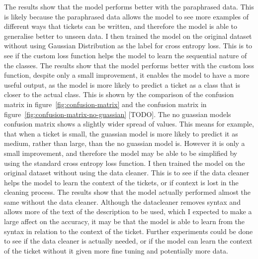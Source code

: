 \documentclass{UoYCSproject}
\begin{document}
    The results show that the model performs better with the paraphrased data. This is likely because the paraphrased data allows the model to see more examples of different ways that tickets can be written, and therefore the model is able to generalise better to unseen data.
    I then trained the model on the original dataset without using Gaussian Distribution as the label for cross entropy loss.  This is to see if the custom loss function helps the model to learn the sequential nature of the classes.
    The results show that the model performs better with the custom loss function, despite only a small improvement, it enables the model to have a more useful output, as the model is more likely to predict a ticket as a class that is closer to the actual class. This is shown by the comparison of the confusion matrix in figure~\ref{fig:confusion-matrix} and the confusion matrix in figure~\ref{fig:confusion-matrix-no-guassian} [TODO]. The no guassian models confusion matrix shows a slightly wider spread of values. This means for example, that when a ticket is small, the guassian model is more likely to predict it as medium, rather than large, than the no guassian model is.
    However it is only a small improvement, and therefore the model may be able to be simplified by using the standard cross entropy loss function.
    I then trained the model on the original dataset without using the data cleaner. This is to see if the data cleaner helps the model to learn the context of the tickets, or if context is lost in the cleaning process.
    The results show that the model actually performed almost the same without the data cleaner. Although the datacleaner removes syntax and allows more of the text of the description to be used, which I expected to make a large affect on the accuracy, it may be that the model is able to learn from the syntax in relation to the context of the ticket.
    Further experiments could be done to see if the data cleaner is actually needed, or if the model can learn the context of the ticket without it given more fine tuning and potentially more data.










\end{document}
